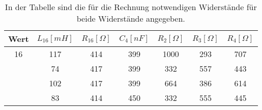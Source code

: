 \documentclass[titlepage = firstcover]{scrartcl}
\begin{document}
  \begin{table}[h]
    \centering
    \caption{In der Tabelle sind die für die Rechnung notwendigen Widerstände für beide Widerstände angegeben.}
    \label{tab:Maxwell}
    \begin{tabular}{c c c c c c c}
      \toprule
      {Wert} & {$L_{\text{16}} [mH]$} & {$R_{\text{16}} [\Omega]$} & {$C_{\text{4}} [nF]$} & {$R_{\text{2}} [\Omega]$} & {$R_{\text{3}} [\Omega]$} & {$R_{\text{4}} [\Omega]$} \\
      \midrule 
      16 & 117 & 414 & 399 & 1000 & 293 & 707  \\
       & 74 & 417 & 399 & 332 & 557 & 443 \\
       & 102 & 417 & 399 & 664 & 386 & 614 \\
       & 83 & 414 & 450 & 332 & 555 & 445 \\
      \bottomrule
    \end{tabular}
  \end{table}
\end{document}
